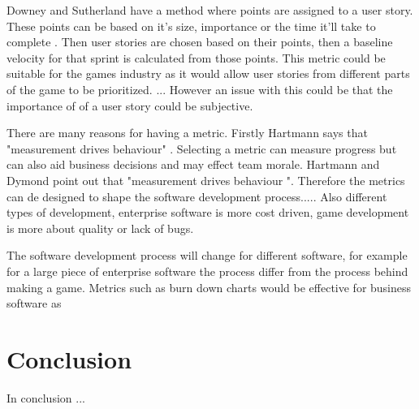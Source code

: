 \documentclass{scrartcl}
\begin{document}
Downey and Sutherland have a method where points are assigned to a user story. These points can be based on it's size, importance or the time it'll take to complete \cite{Downey}. Then user stories are chosen based on their points, then a baseline velocity for that sprint is calculated from those points. This metric could be suitable for the games industry as it would allow user stories from different parts of the game to be prioritized. ... However an issue with this could be that the importance of of a user story could be subjective. 


There are many reasons for having a metric. Firstly Hartmann says that "measurement drives behaviour" \cite{Hartmann}.  %
Selecting a metric can measure progress but can also aid business decisions and may effect team morale. 
Hartmann and Dymond point out that "measurement drives behaviour ". Therefore the metrics can de designed to shape the software development process.....   Also different types of development, enterprise software is more cost driven, game development is more about quality or lack of bugs. 


The software development process will change for different software, for example for a large piece of enterprise software the process differ from the process behind making a game. Metrics such as burn down charts would be effective for business software as %





\section{Conclusion}
In conclusion ... %
	


	
\end{document}
